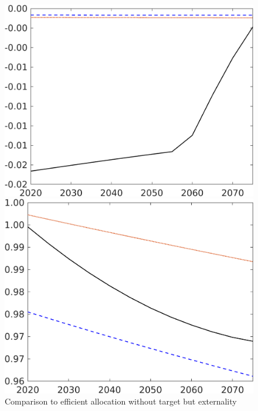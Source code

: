 \begin{figure}[h!!]
	\centering
	\caption{Comparison to efficient allocation without target but externality }\label{fig:Compno_eff_extern22}
	\begin{minipage}[]{0.32\textwidth}
		\includegraphics[width=1\textwidth]{../../codding_model/own_basedOnFried/optimalPol_elastS_DisuSci/figures/all_1705/Extern_CompEff_UtilSci_spillover0_noskill0_sep1_BN0_ineq0_red0_etaa0.79_lgd0.png}
	\end{minipage}
	\begin{minipage}[]{0.32\textwidth}
		\includegraphics[width=1\textwidth]{../../codding_model/own_basedOnFried/optimalPol_elastS_DisuSci/figures/all_1705/Extern_CompEff_pg_spillover0_noskill0_sep1_BN0_ineq0_red0_etaa0.79_lgd0.png}

\end{minipage}
\end{figure}
